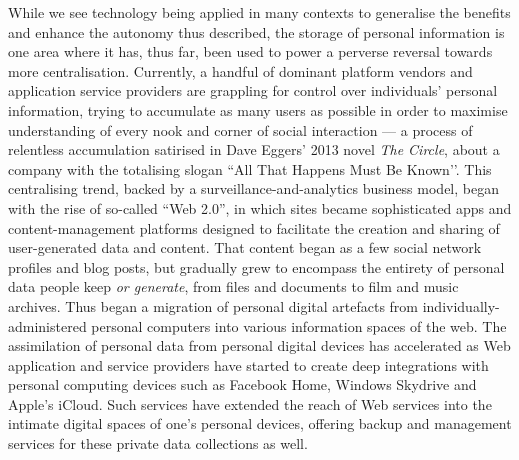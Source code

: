 \documentclass[graybox]{svmult}
\begin{document}
While we see technology being applied in many contexts to generalise the benefits and enhance the autonomy thus described, the storage of personal information is one area where it has, thus far, been used to power a perverse reversal towards more centralisation. Currently, a handful of dominant platform vendors and application service providers are grappling for control over individuals' personal information, trying to accumulate as many users as possible in order to maximise understanding of every nook and corner of social interaction --- a process of relentless accumulation satirised in Dave Eggers’ 2013 novel {\em The Circle}, about a company with the totalising slogan ``All That Happens Must Be Known’’. This centralising trend, backed by a surveillance-and-analytics business model, began with the rise of so-called ``Web 2.0'', in which sites became sophisticated apps and content-management platforms designed to facilitate the creation and sharing of user-generated data and content. That content began as a few social network profiles and blog posts, but gradually grew to encompass the entirety of personal data people keep {\em or generate}, from files and documents to film and music archives. Thus began a migration of personal digital artefacts from individually-administered personal computers into various information spaces of the web.  The assimilation of personal data from personal digital devices has accelerated as Web application and service providers have started to create deep integrations with personal computing devices such as Facebook Home\cite{facebook}, Windows Skydrive\cite{skydrive} and Apple's iCloud\cite{icloud}. Such services have extended the reach of Web services into the intimate digital spaces of one's personal devices, offering backup and management services for these private data collections as well.
\end{document}
